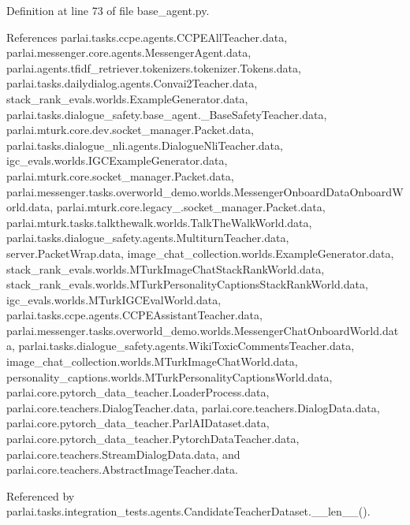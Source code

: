 Definition at line 73 of file base\+\_\+agent.\+py.



References parlai.\+tasks.\+ccpe.\+agents.\+C\+C\+P\+E\+All\+Teacher.\+data, parlai.\+messenger.\+core.\+agents.\+Messenger\+Agent.\+data, parlai.\+agents.\+tfidf\+\_\+retriever.\+tokenizers.\+tokenizer.\+Tokens.\+data, parlai.\+tasks.\+dailydialog.\+agents.\+Convai2\+Teacher.\+data, stack\+\_\+rank\+\_\+evals.\+worlds.\+Example\+Generator.\+data, parlai.\+tasks.\+dialogue\+\_\+safety.\+base\+\_\+agent.\+\_\+\+Base\+Safety\+Teacher.\+data, parlai.\+mturk.\+core.\+dev.\+socket\+\_\+manager.\+Packet.\+data, parlai.\+tasks.\+dialogue\+\_\+nli.\+agents.\+Dialogue\+Nli\+Teacher.\+data, igc\+\_\+evals.\+worlds.\+I\+G\+C\+Example\+Generator.\+data, parlai.\+mturk.\+core.\+socket\+\_\+manager.\+Packet.\+data, parlai.\+messenger.\+tasks.\+overworld\+\_\+demo.\+worlds.\+Messenger\+Onboard\+Data\+Onboard\+World.\+data, parlai.\+mturk.\+core.\+legacy\+\_.\+socket\+\_\+manager.\+Packet.\+data, parlai.\+mturk.\+tasks.\+talkthewalk.\+worlds.\+Talk\+The\+Walk\+World.\+data, parlai.\+tasks.\+dialogue\+\_\+safety.\+agents.\+Multiturn\+Teacher.\+data, server.\+Packet\+Wrap.\+data, image\+\_\+chat\+\_\+collection.\+worlds.\+Example\+Generator.\+data, stack\+\_\+rank\+\_\+evals.\+worlds.\+M\+Turk\+Image\+Chat\+Stack\+Rank\+World.\+data, stack\+\_\+rank\+\_\+evals.\+worlds.\+M\+Turk\+Personality\+Captions\+Stack\+Rank\+World.\+data, igc\+\_\+evals.\+worlds.\+M\+Turk\+I\+G\+C\+Eval\+World.\+data, parlai.\+tasks.\+ccpe.\+agents.\+C\+C\+P\+E\+Assistant\+Teacher.\+data, parlai.\+messenger.\+tasks.\+overworld\+\_\+demo.\+worlds.\+Messenger\+Chat\+Onboard\+World.\+data, parlai.\+tasks.\+dialogue\+\_\+safety.\+agents.\+Wiki\+Toxic\+Comments\+Teacher.\+data, image\+\_\+chat\+\_\+collection.\+worlds.\+M\+Turk\+Image\+Chat\+World.\+data, personality\+\_\+captions.\+worlds.\+M\+Turk\+Personality\+Captions\+World.\+data, parlai.\+core.\+pytorch\+\_\+data\+\_\+teacher.\+Loader\+Process.\+data, parlai.\+core.\+teachers.\+Dialog\+Teacher.\+data, parlai.\+core.\+teachers.\+Dialog\+Data.\+data, parlai.\+core.\+pytorch\+\_\+data\+\_\+teacher.\+Parl\+A\+I\+Dataset.\+data, parlai.\+core.\+pytorch\+\_\+data\+\_\+teacher.\+Pytorch\+Data\+Teacher.\+data, parlai.\+core.\+teachers.\+Stream\+Dialog\+Data.\+data, and parlai.\+core.\+teachers.\+Abstract\+Image\+Teacher.\+data.



Referenced by parlai.\+tasks.\+integration\+\_\+tests.\+agents.\+Candidate\+Teacher\+Dataset.\+\_\+\+\_\+len\+\_\+\+\_\+().

